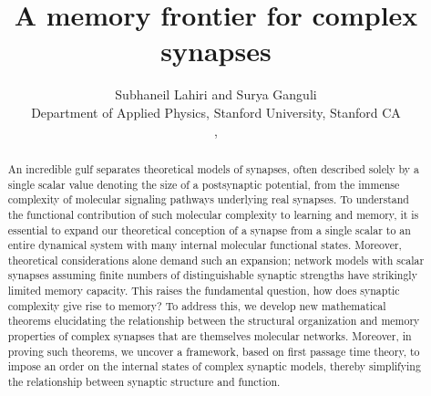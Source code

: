 \documentclass{article} %
\title{A memory frontier for complex synapses}
\author{Subhaneil Lahiri and Surya Ganguli\\
Department of Applied Physics, Stanford University, Stanford CA\\
\emaillink{sulahiri@stanford.edu}, \emaillink{sganguli@stanford.edu}
%
}
\begin{document}
\maketitle




\begin{abstract}
  An incredible gulf separates theoretical models of synapses, often described solely by a single scalar value denoting the size of a postsynaptic potential, from the immense complexity of molecular signaling pathways underlying real synapses.
  To understand the functional contribution of such molecular complexity to learning and memory, it is essential to expand our theoretical conception of a synapse from a single scalar to an entire dynamical system with many internal molecular functional states.
  Moreover, theoretical considerations alone demand such an expansion; network models with scalar synapses assuming finite numbers of distinguishable synaptic strengths have strikingly limited memory capacity.
  This raises the fundamental question, how does synaptic complexity give rise to memory?
  To address this, we develop new mathematical theorems elucidating the relationship between the structural organization and memory properties of complex synapses that are themselves molecular networks.
  Moreover, in proving such theorems, we uncover a framework, based on first passage time theory, to impose an order on the internal states of complex synaptic models, thereby simplifying the relationship between synaptic structure and function.

\end{abstract}




%
\end{document}
